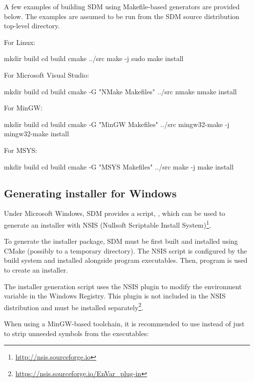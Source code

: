 \documentclass[a4paper,12pt,twoside,extrafontsizes]{memoir}
\begin{document}
A few examples of building SDM using Makefile-based generators are provided below. The examples are assumed to be run from the SDM source distribution top-level directory.

For Linux:

\begin{shellcmds}
mkdir build
cd build
cmake ../src
make -j
sudo make install
\end{shellcmds}

For Microsoft Visual Studio:

\begin{shellcmds}
mkdir build
cd build
cmake -G "NMake Makefiles" ../src
nmake
nmake install
\end{shellcmds}

For MinGW:

\begin{shellcmds}
mkdir build
cd build
cmake -G "MinGW Makefiles" ../src
mingw32-make -j
mingw32-make install
\end{shellcmds}

For MSYS:

\begin{shellcmds}
mkdir build
cd build
cmake -G "MSYS Makefiles" ../src
make -j
make install
\end{shellcmds}

\subsection{Generating installer for Windows}
\label{subsec:wininstaller}

Under Microsoft Windows, SDM provides a script, , which can be used to generate an installer with NSIS (Nullsoft Scriptable Install System)\footnote{\url{http://nsis.sourceforge.io}}.

To generate the installer package, SDM must be first built and installed using CMake (possibly to a temporary directory). The NSIS script is configured by the build system and installed alongside program executables. Then,  program is used to create an installer.

The installer generation script uses the  NSIS plugin to modify the  environment variable in the Windows Registry. This plugin is not included in the NSIS distribution and must be installed separately\footnote{\url{https://nsis.sourceforge.io/EnVar_plug-in}}.

When using a MinGW-based toolchain, it is recommended to use  instead of just  to strip unneeded symbols from the executables:
\end{document}
